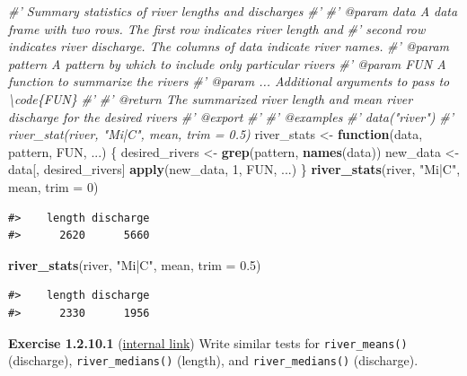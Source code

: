 \documentclass[
]{book}
\newenvironment{Shaded}{\begin{snugshade}}{\end{snugshade}}
\newcommand{\CommentTok}[1]{\textcolor[rgb]{0.56,0.35,0.01}{\textit{#1}}}
\newcommand{\ControlFlowTok}[1]{\textcolor[rgb]{0.13,0.29,0.53}{\textbf{#1}}}
\newcommand{\DataTypeTok}[1]{\textcolor[rgb]{0.13,0.29,0.53}{#1}}
\newcommand{\DecValTok}[1]{\textcolor[rgb]{0.00,0.00,0.81}{#1}}
\newcommand{\FloatTok}[1]{\textcolor[rgb]{0.00,0.00,0.81}{#1}}
\newcommand{\KeywordTok}[1]{\textcolor[rgb]{0.13,0.29,0.53}{\textbf{#1}}}
\newcommand{\NormalTok}[1]{#1}
\newcommand{\StringTok}[1]{\textcolor[rgb]{0.31,0.60,0.02}{#1}}
\begin{document}
\begin{Shaded}
\begin{Highlighting}[]
\CommentTok{#' Summary statistics of river lengths and discharges}
\CommentTok{#'}
\CommentTok{#' @param data A data frame with two rows. The first row indicates river length and}
\CommentTok{#'   second row indicates river discharge. The columns of data indicate river names.}
\CommentTok{#' @param pattern A pattern by which to include only particular rivers}
\CommentTok{#' @param FUN A function to summarize the rivers}
\CommentTok{#' @param ... Additional arguments to pass to \textbackslash{}code\{FUN\}}
\CommentTok{#'}
\CommentTok{#' @return The summarized river length and mean river discharge for the desired rivers}
\CommentTok{#' @export}
\CommentTok{#'}
\CommentTok{#' @examples}
\CommentTok{#' data("river")}
\CommentTok{#' river_stat(river, "Mi|C", mean, trim = 0.5)}
\NormalTok{river_stats <-}\StringTok{ }\ControlFlowTok{function}\NormalTok{(data, pattern, FUN, ...) \{}
\NormalTok{  desired_rivers <-}\StringTok{ }\KeywordTok{grep}\NormalTok{(pattern, }\KeywordTok{names}\NormalTok{(data))}
\NormalTok{  new_data <-}\StringTok{ }\NormalTok{data[, desired_rivers]}
  \KeywordTok{apply}\NormalTok{(new_data, }\DecValTok{1}\NormalTok{, FUN, ...)}
\NormalTok{\}}
\KeywordTok{river_stats}\NormalTok{(river, }\StringTok{"Mi|C"}\NormalTok{, mean, }\DataTypeTok{trim =} \DecValTok{0}\NormalTok{)}
\end{Highlighting}
\end{Shaded}

\begin{verbatim}
#>    length discharge 
#>      2620      5660
\end{verbatim}

\begin{Shaded}
\begin{Highlighting}[]
\KeywordTok{river_stats}\NormalTok{(river, }\StringTok{"Mi|C"}\NormalTok{, mean, }\DataTypeTok{trim =} \FloatTok{0.5}\NormalTok{)}
\end{Highlighting}
\end{Shaded}

\begin{verbatim}
#>    length discharge 
#>      2330      1956
\end{verbatim}

\textbf{Exercise 1.2.10.1} (\protect\hyperlink{ex-set4}{internal link})
Write similar tests for \texttt{river\_means()} (discharge), \texttt{river\_medians()} (length), and \texttt{river\_medians()} (discharge).
\end{document}

